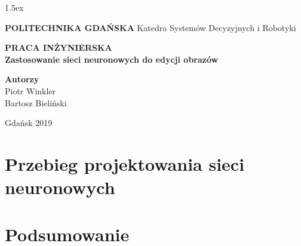\documentclass[10pt]{article}
\begin{document}
\parskip 1.5ex %

\baselineskip=15pt  %
\linespread{1.3} %



\begin{titlepage}
  \begin{center}

    \vspace*{1cm}
    \Huge
    \textbf{POLITECHNIKA GDAŃSKA}
    \newline
    \vspace{0.5cm}
    \LARGE
    Katedra Systemów Decyzyjnych i Robotyki

    \vspace{1.5cm}
    \textbf{PRACA INŻYNIERSKA}
    \\[0.5cm]
    \textbf{Zastosowanie sieci neuronowych do edycji obrazów}

    \vspace{2.5cm}
    \Large
    \textbf{Autorzy}\\
    Piotr Winkler\\
    Bartosz Bieliński

    \vspace{3.5cm}
    Gdańsk 2019

  \end{center}
\end{titlepage}

\setcounter{page}{2}






\newpage
  \tableofcontents







\section{Przebieg projektowania sieci neuronowych}

\section{Podsumowanie}
\end{document}
